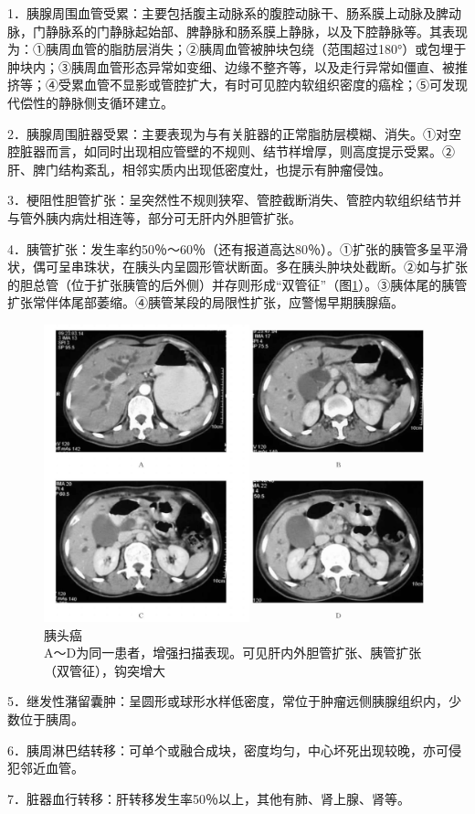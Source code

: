 1．胰腺周围血管受累：主要包括腹主动脉系的腹腔动脉干、肠系膜上动脉及脾动脉，门静脉系的门静脉起始部、脾静脉和肠系膜上静脉，以及下腔静脉等。其表现为：①胰周血管的脂肪层消失；②胰周血管被肿块包绕（范围超过180°）或包埋于肿块内；③胰周血管形态异常如变细、边缘不整齐等，以及走行异常如僵直、被推挤等；④受累血管不显影或管腔扩大，有时可见腔内软组织密度的癌栓；⑤可发现代偿性的静脉侧支循环建立。

2．胰腺周围脏器受累：主要表现为与有关脏器的正常脂肪层模糊、消失。①对空腔脏器而言，如同时出现相应管壁的不规则、结节样增厚，则高度提示受累。②肝、脾门结构紊乱，相邻实质内出现低密度灶，也提示有肿瘤侵蚀。

3．梗阻性胆管扩张：呈突然性不规则狭窄、管腔截断消失、管腔内软组织结节并与管外胰内病灶相连等，部分可无肝内外胆管扩张。

4．胰管扩张：发生率约50％～60％（还有报道高达80％）。①扩张的胰管多呈平滑状，偶可呈串珠状，在胰头内呈圆形管状断面。多在胰头肿块处截断。②如与扩张的胆总管（位于扩张胰管的后外侧）并存则形成“双管征”（图\ref{fig13-4}）。③胰体尾的胰管扩张常伴体尾部萎缩。④胰管某段的局限性扩张，应警惕早期胰腺癌。

\begin{figure}[!htbp]
 \centering
 \includegraphics[width=.7\textwidth,height=\textheight,keepaspectratio]{./images/Image00305.jpg}
 \captionsetup{justification=centering}
 \caption{胰头癌\\{\small A～D为同一患者，增强扫描表现。可见肝内外胆管扩张、胰管扩张（双管征），钩突增大}}
 \label{fig13-4}
  \end{figure} 

5．继发性潴留囊肿：呈圆形或球形水样低密度，常位于肿瘤远侧胰腺组织内，少数位于胰周。

6．胰周淋巴结转移：可单个或融合成块，密度均匀，中心坏死出现较晚，亦可侵犯邻近血管。

7．脏器血行转移：肝转移发生率50％以上，其他有肺、肾上腺、肾等。

